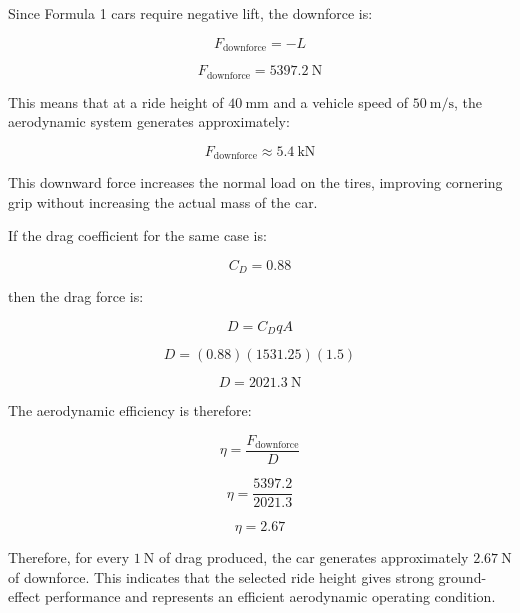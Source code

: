 \documentclass[12pt,a4paper]{article}
\begin{document}
Since Formula 1 cars require negative lift, the downforce is:

\begin{equation}
    F_{\text{downforce}} = -L
\end{equation}

\begin{equation}
    F_{\text{downforce}} = 5397.2~\text{N}
\end{equation}

This means that at a ride height of $40~\text{mm}$ and a vehicle speed of $50~\text{m/s}$,
the aerodynamic system generates approximately:

\begin{equation}
    F_{\text{downforce}} \approx 5.4~\text{kN}
\end{equation}

This downward force increases the normal load on the tires, improving cornering grip
without increasing the actual mass of the car.

If the drag coefficient for the same case is:

\begin{equation}
    C_D = 0.88
\end{equation}

then the drag force is:

\begin{equation}
    D = C_D q A
\end{equation}

\begin{equation}
    D = (0.88)(1531.25)(1.5)
\end{equation}

\begin{equation}
    D = 2021.3~\text{N}
\end{equation}

The aerodynamic efficiency is therefore:

\begin{equation}
    \eta = \frac{F_{\text{downforce}}}{D}
\end{equation}

\begin{equation}
    \eta = \frac{5397.2}{2021.3}
\end{equation}

\begin{equation}
    \eta = 2.67
\end{equation}

Therefore, for every $1~\text{N}$ of drag produced, the car generates approximately
$2.67~\text{N}$ of downforce. This indicates that the selected ride height gives strong
ground-effect performance and represents an efficient aerodynamic operating condition.
\end{document}
